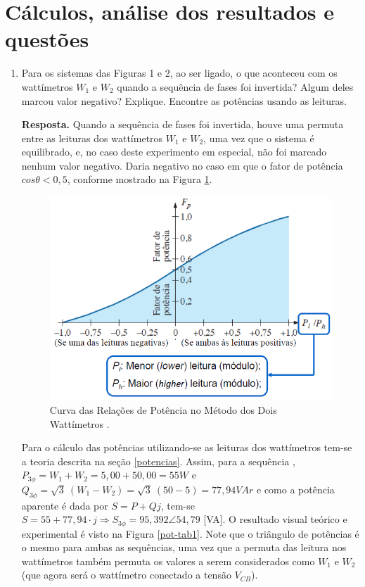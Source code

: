 \documentclass[a4paper,12pt,oneside,openany,table,xcdraw]{article}
\begin{document}
\section{Cálculos, análise dos resultados e questões} %
\begin{enumerate}[1)]
\item Para os sistemas das Figuras 1 e 2, ao ser ligado, o que aconteceu com os wattímetros $W_1$ e $W_2$ quando a sequência de fases foi invertida? Algum deles marcou valor negativo? Explique. Encontre as potências usando as leituras. 

\vspace{0.8mm}
\textbf{Resposta.} Quando  a sequência de fases foi invertida, houve uma permuta entre as leituras dos wattímetros $W_1$ e $W_2$, uma vez que o sistema é equilibrado, e, no caso deste experimento em especial, não foi marcado nenhum valor negativo. Daria negativo no caso em que o fator de potência $cos \theta <0,5$, conforme mostrado na Figura \ref{fp}.
\begin{figure}[H]
\centering
\captionsetup{font=scriptsize}
\includegraphics[width=13cm]{fp}
\caption{Curva das Relações de Potência no Método dos Dois Wattímetros \cite{ph}.}
\label{fp}
\end{figure}

Para o cálculo das potências utilizando-se as leituras dos wattímetros tem-se a teoria descrita na seção \ref{potencias}. Assim, para a sequência , $P_{3\phi}=W_1+W_2 = 5,00 + 50,00 = 55 W$ e $Q_{3\phi} = \sqrt{3}\ (W_1 - W_2) = \sqrt{3}\ (50 - 5) = 77,94 VAr$ e como a potência aparente é dada por $S=P+Qj$, tem-se $S= 55 + 77,94\cdot j \Rightarrow S_{3\phi} = 95,392\angle 54,79$ [VA]. O resultado visual teórico e experimental é visto na Figura \ref{pot-tab1}. Note que o triângulo de potências é o mesmo para ambas as sequências, uma vez que a permuta das leitura nos wattímetros também permuta os valores a serem considerados como $W_1$ e $W_2$ (que agora será o wattímetro conectado a tensão $V_{CB}$). 


\end{enumerate}
\end{document}
